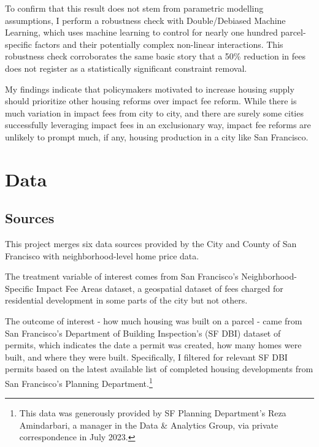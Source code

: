 \documentclass[a4paper,12pt]{article}
\begin{document}
To confirm that this result does not stem from parametric modelling assumptions, I perform a robustness check with Double/Debiased Machine Learning, which uses machine learning to control for nearly one hundred parcel-specific factors and their potentially complex non-linear interactions. This robustness check corroborates the same basic story that a 50\% reduction in fees does not register as a statistically significant constraint removal.

My findings indicate that policymakers motivated to increase housing supply should prioritize other housing reforms over impact fee reform. While there is much variation in impact fees from city to city, and there are surely some cities successfully leveraging impact fees in an exclusionary way, impact fee reforms are unlikely to prompt much, if any, housing production in a city like San Francisco.

\section{Data}
\subsection{Sources}
\label{data.sources} 


This project merges six data sources provided by the City and County of San Francisco with neighborhood-level home price data.

The treatment variable of interest comes from San Francisco's Neighborhood-Specific Impact Fee Areas dataset, a geospatial dataset of fees charged for residential development in some parts of the city but not others.

The outcome of interest - how much housing was built on a parcel - came from San Francisco's Department of Building Inspection's (SF DBI) dataset of permits, which indicates the date a permit was created, how many homes were built, and where they were built. Specifically, I filtered for relevant SF DBI permits based on the latest available list of completed housing developments from San Francisco's Planning Department.\footnote{This data was generously provided by SF Planning Department's Reza Amindarbari, a manager in the Data \& Analytics Group, via private correspondence in July 2023.}
\end{document}
